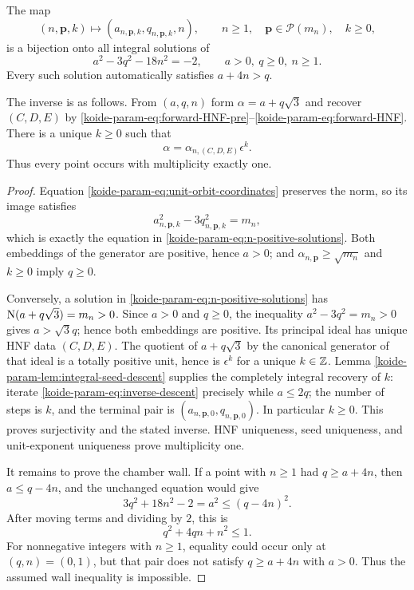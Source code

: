 \begin{theorem}
\label{koide-param-thm:integral-parametrization}
The map
\begin{equation}
 (n,\mathbf p,k)
 \longmapsto
 (a_{n,\mathbf p,k},q_{n,\mathbf p,k},n),
 \qquad
 n\geq1,\quad\mathbf p\in\mathcal P(m_n),\quad k\geq0,
 \label{koide-param-eq:parameter-map}
\end{equation}
is a bijection onto all integral solutions of
\begin{equation}
 a^2-3q^2-18n^2=-2,\qquad a>0,\ q\geq0,\ n\geq1.
 \label{koide-param-eq:n-positive-solutions}
\end{equation}
Every such solution automatically satisfies $a+4n>q$.

The inverse is as follows.  From $(a,q,n)$ form
$\alpha=a+q\sqrt3$ and recover $(C,D,E)$ by
\eqref{koide-param-eq:forward-HNF-pre}--\eqref{koide-param-eq:forward-HNF}.  There is a unique
$k\geq0$ such that
\begin{equation}
 \alpha=\alpha_{n,(C,D,E)}\epsilon^k.
 \label{koide-param-eq:recover-k}
\end{equation}
Thus every point occurs with multiplicity exactly one.
\end{theorem}

\begin{proof}
Equation \eqref{koide-param-eq:unit-orbit-coordinates} preserves the norm, so its
image satisfies
\[
 a_{n,\mathbf p,k}^2-3q_{n,\mathbf p,k}^2=m_n,
\]
which is exactly the equation in \eqref{koide-param-eq:n-positive-solutions}.
Both embeddings of the generator are positive, hence $a>0$; and
$\alpha_{n,\mathbf p}\geq\sqrt{m_n}$ and $k\geq0$ imply $q\geq0$.

Conversely, a solution in \eqref{koide-param-eq:n-positive-solutions} has
\(\operatorname N(a+q\sqrt3)=m_n>0\).  Since $a>0$ and $q\geq0$, the inequality
$a^2-3q^2=m_n>0$ gives $a>\sqrt3q$; hence both embeddings are positive.
Its principal ideal has unique HNF data $(C,D,E)$.  The quotient of
 $a+q\sqrt3$ by the canonical generator of that ideal is a totally positive
 unit, hence is $\epsilon^k$ for a unique $k\in\mathbb Z$.  Lemma
 \ref{koide-param-lem:integral-seed-descent} supplies the completely integral recovery
 of $k$: iterate \eqref{koide-param-eq:inverse-descent} precisely while $a\leq2q$;
 the number of steps is $k$, and the terminal pair is
 $(a_{n,\mathbf p,0},q_{n,\mathbf p,0})$.  In particular $k\geq0$.  This
 proves surjectivity and the stated inverse.  HNF uniqueness, seed
 uniqueness, and unit-exponent uniqueness prove multiplicity one.

It remains to prove the chamber wall.  If a point with $n\geq1$ had
$q\geq a+4n$, then $a\leq q-4n$, and the unchanged equation would give
\[
 3q^2+18n^2-2=a^2\leq(q-4n)^2.
\]
After moving terms and dividing by $2$, this is
\[
 q^2+4qn+n^2\leq1.
\]
For nonnegative integers with $n\geq1$, equality could occur only at
$(q,n)=(0,1)$, but that pair does not satisfy $q\geq a+4n$ with $a>0$.
Thus the assumed wall inequality is impossible.
\end{proof}

